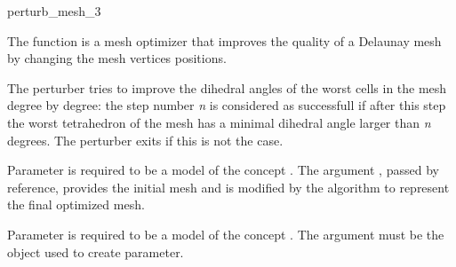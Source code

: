 \ccRefPageBegin


\begin{ccRefFunction}{perturb_mesh_3}  %


\ccDefinition
  
The function \ccRefName{} is a mesh optimizer that
 improves the quality of a Delaunay mesh
by changing the mesh vertices positions.

The perturber tries to improve the dihedral angles of the worst cells in the mesh
degree by degree: the
step  number \emph{n} is considered as successfull 
if after this step the worst tetrahedron of the mesh has a minimal dihedral
angle larger than \emph{n} degrees.
The perturber exits if this is not the case.




\ccParameters

Parameter  is required to be a model of the concept
.
The argument , passed by
reference, provides the initial mesh  
and is modified  by the algorithm 
to represent the final optimized mesh.

Parameter  is required to be a model of the concept
. The argument  must be the 
object used to create  parameter.


\end{ccRefFunction}
